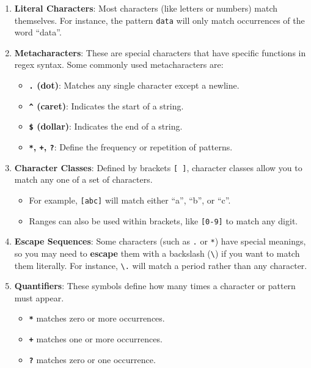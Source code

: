 \documentclass[
  letterpaper,
  DIV=11,
  numbers=noendperiod]{scrreprt}
\providecommand{\tightlist}{%
  \setlength{\itemsep}{0pt}\setlength{\parskip}{0pt}}\usepackage{longtable,booktabs,array}
\begin{document}
\begin{enumerate}
\def\labelenumi{\arabic{enumi}.}
\item
  \textbf{Literal Characters}: Most characters (like letters or numbers)
  match themselves. For instance, the pattern \texttt{data} will only
  match occurrences of the word ``data''.
\item
  \textbf{Metacharacters}: These are special characters that have
  specific functions in regex syntax. Some commonly used metacharacters
  are:

  \begin{itemize}
  \tightlist
  \item
    \textbf{\texttt{.} (dot)}: Matches any single character except a
    newline.
  \item
    \textbf{\texttt{\^{}} (caret)}: Indicates the start of a string.
  \item
    \textbf{\texttt{\$} (dollar)}: Indicates the end of a string.
  \item
    \textbf{\texttt{*}, \texttt{+}, \texttt{?}}: Define the frequency or
    repetition of patterns.
  \end{itemize}
\item
  \textbf{Character Classes}: Defined by brackets \texttt{{[}\ {]}},
  character classes allow you to match any one of a set of characters.

  \begin{itemize}
  \tightlist
  \item
    For example, \texttt{{[}abc{]}} will match either ``a'', ``b'', or
    ``c''.
  \item
    Ranges can also be used within brackets, like \texttt{{[}0-9{]}} to
    match any digit.
  \end{itemize}
\item
  \textbf{Escape Sequences}: Some characters (such as \texttt{.} or
  \texttt{*}) have special meanings, so you may need to \textbf{escape}
  them with a backslash (\texttt{\textbackslash{}}) if you want to match
  them literally. For instance, \texttt{\textbackslash{}.} will match a
  period rather than any character.
\item
  \textbf{Quantifiers}: These symbols define how many times a character
  or pattern must appear.

  \begin{itemize}
  \tightlist
  \item
    \textbf{\texttt{*}} matches zero or more occurrences.
  \item
    \textbf{\texttt{+}} matches one or more occurrences.
  \item
    \textbf{\texttt{?}} matches zero or one occurrence.
  \end{itemize}
\end{enumerate}
\end{document}
